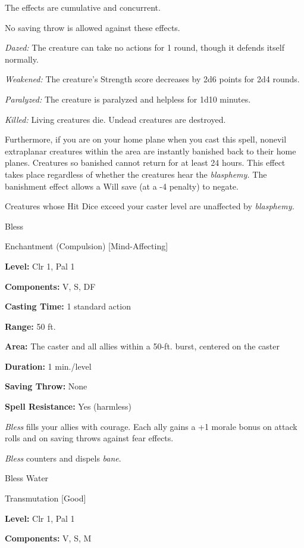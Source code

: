 \documentclass{article}
\begin{document}
The effects are cumulative and concurrent.

No saving throw is allowed against these effects.

\textit{Dazed: }The creature can take no actions for 1 round, though it defends 
itself normally.

\textit{Weakened: }The creature's Strength score decreases by 2d6 points for 2d4 
rounds.

\textit{Paralyzed: }The creature is paralyzed and helpless for 1d10 minutes.

\textit{Killed: }Living creatures die. Undead creatures are destroyed.

Furthermore, if you are on your home plane when you cast this spell, nonevil extraplanar 
creatures within the area are instantly banished back to their home planes. Creatures 
so banished cannot return for at least 24 hours. This effect takes place regardless 
of whether the creatures hear the \textit{blasphemy. }The banishment effect allows 
a Will save (at a -4 penalty) to negate.

Creatures whose Hit Dice exceed your caster level are unaffected by \textit{blasphemy.}

\vspace{12pt}
Bless

Enchantment (Compulsion) [Mind-Affecting]

\textbf{Level:} Clr 1, Pal 1

\textbf{Components:} V, S, DF

\textbf{Casting Time:} 1 standard action

\textbf{Range:} 50 ft.

\textbf{Area:} The caster and all allies within a 50-ft. burst, centered on the 
caster

\textbf{Duration:} 1 min./level

\textbf{Saving Throw:} None

\textbf{Spell Resistance:} Yes (harmless)

\textit{Bless }fills your allies with courage. Each ally gains a +1 morale bonus 
on attack rolls and on saving throws against fear effects.

\textit{Bless }counters and dispels \textit{bane}.

\vspace{12pt}
Bless Water

Transmutation [Good]

\textbf{Level:} Clr 1, Pal 1

\textbf{Components:} V, S, M
\end{document}
